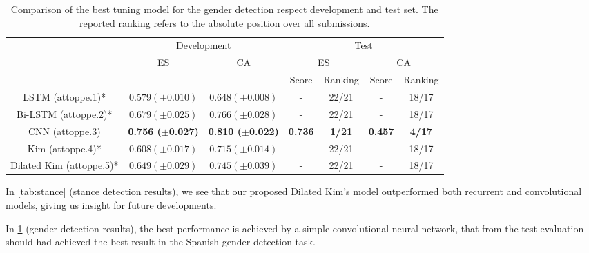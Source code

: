 \begin{table}[h]
	\centering
	\caption{Comparison of the best tuning model for the gender detection respect development and test set. The reported ranking refers to the absolute position over all submissions.}
	\label{tab:gender}
	\begin{tabular}{c|cc|cc|cc}
		\hline\noalign{\smallskip}
		\multirow{3}{*}{System}	& \multicolumn{2}{c|}{Development} & \multicolumn{4}{c}{Test}	\\
		\cline{2-7}
		& \multirow{2}{*}{ES}	& \multirow{2}{*}{CA}	& \multicolumn{2}{c|}{ES} & \multicolumn{2}{c}{CA}	\\
		\cline{4-7}
		&		&		& Score & Ranking & Score & Ranking \\
		\noalign{\smallskip}
		\hline
		\noalign{\smallskip}
		LSTM (attoppe.1)*		& $0.579 (\pm0.010)$ & $0.648 (\pm0.008)$ & - & 22/21 & - & 18/17 \\
		Bi-LSTM	(attoppe.2)*		& $0.679 (\pm0.025)$ & $0.766 (\pm0.028)$ & - & 22/21 & - & 18/17 \\
		CNN (attoppe.3)& \textbf{0.756 ($\pm$0.027)} & \textbf{0.810 ($\pm$0.022)} & \textbf{0.736} & \textbf{1/21} & \textbf{0.457} & \textbf{4/17} \\
		Kim (attoppe.4)*			& $0.608 (\pm0.017)$ & $0.715 (\pm0.014)$ & - & 22/21 & - & 18/17 \\
		Dilated Kim	(attoppe.5)*	& $0.649 (\pm0.029)$ & $0.745 (\pm0.039)$ & - & 22/21 & - & 18/17 \\
		\hline
	\end{tabular}
\end{table}

In \cref{tab:stance} (stance detection results), we see that our proposed Dilated Kim's model outperformed both recurrent and convolutional models, giving us insight for future developments.

In \cref{tab:gender} (gender detection results), the best performance is achieved by a simple convolutional neural network, that from the test evaluation should had achieved the best result in the Spanish gender detection task.